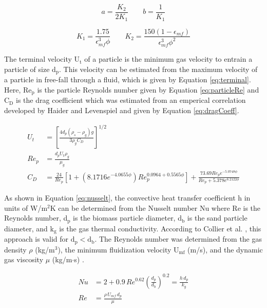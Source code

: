 \documentclass{article}
\begin{document}
\begin{equation}
    a = \frac{K_2}{2 K_1} \qquad
    b = \frac{1}{K_1}
\end{equation}

\begin{equation}
    K_1 = \frac{1.75}{\epsilon_{mf}^3 \phi} \qquad
    K_2 = \frac{150(1-\epsilon_{mf})}{\epsilon_{mf}^3 \phi^2}
\end{equation}

The terminal velocity U$_\text{t}$ of a particle is the minimum gas velocity to entrain a particle of size d$_\text{p}$. This velocity can be estimated from the maximum velocity of a particle in free-fall through a fluid, which is given by Equation \ref{eq:terminal}. Here, Re$_\text{p}$ is the particle Reynolds number given by Equation \ref{eq:particleRe} and C$_\text{D}$ is the drag coefficient which was estimated from an emperical correlation developed by Haider and Levenspiel \cite{haider1989drag} and given by Equation \ref{eq:dragCoeff}.

\begin{align}
    U_{t} &= \left [\frac{4d_{p} \left (\rho_{s}-\rho_{g} \right )g}{3\rho_{g}C_{D}}\right ]^{1/2} \label{eq:terminal} \\
    Re_{p} &= \frac{d_{p}U_{t}\rho_{g}}{\mu_{g}} \label{eq:particleRe} \\
    C_{D} &= \frac{24}{Re_{p}}\left [ 1+\left ( 8.1716e^{-4.0655\phi } \right )Re_{p}^{0.0964+0.5565\phi} \right ]+\frac{73.69Re_{p}e^{-5.0748\phi}}{Re_{p}+5.378e^{6.2122\phi}} \label{eq:dragCoeff}
\end{align}

As shown in Equation \ref{eq:nusselt}, the convective heat transfer coefficient h in units of W/m$^2$K can be determined from the Nusselt number Nu where Re is the Reynolds number, d$_\text{p}$ is the biomass particle diameter, d$_\text{b}$ is the sand particle diameter, and k$_\text{g}$ is the gas thermal conductivity. According to Collier et al. \cite{Collier-2004}, this approach is valid for $\text{d}_\text{p} < \text{d}_\text{b}$. The Reynolds number was determined from the gas density $\rho$ (kg/m$^3$), the minimum fluidization velocity U$_\text{mf}$ (m/s), and the dynamic gas viscosity $\mu$ (kg/m$\cdot$s) \cite{Papadikis-2010}.

\begin{align}
    Nu &= 2 + 0.9\, Re^{0.62} \left(\frac{d_p}{d_b}\right)^{0.2} = \frac{h\, d_p}{k_g} \label{eq:nusselt} \\
    Re &= \frac{\rho\, U_{mf}\, d_p}{\mu}
\end{align}
\end{document}
